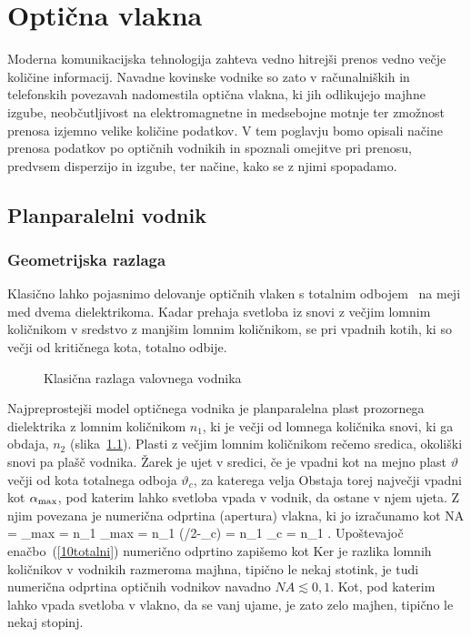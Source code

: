 
\chapter{Optična vlakna}
Moderna komunikacijska tehnologija zahteva vedno hitrejši prenos
vedno večje količine informacij. Navadne kovinske vodnike
so zato v računalniških in telefonskih povezavah nadomestila optična 
vlakna, ki jih odlikujejo majhne izgube, neobčutljivost na elektromagnetne
in medsebojne motnje ter zmožnost prenosa izjemno velike količine podatkov. 
V tem poglavju bomo opisali načine prenosa podatkov po optičnih vodnikih
in spoznali omejitve pri prenosu,
predvsem disperzijo in izgube, ter načine, kako se z njimi spopadamo.

\section{Planparalelni vodnik}
\subsection*{Geometrijska razlaga}
Klasično lahko pojasnimo delovanje optičnih vlaken s totalnim odbojem~
na meji med dvema dielektrikoma. Kadar prehaja svetloba iz snovi 
z večjim lomnim količnikom v sredstvo z manjšim lomnim količnikom,
se pri vpadnih kotih, ki so večji od kritičnega kota, totalno odbije. 
\begin{figure}[h]
\centering
\def\svgwidth{110truemm} 

\caption{Klasična razlaga valovnega vodnika}
\label{fig:vodnik}
\end{figure}

Najpreprostejši model optičnega vodnika je planparalelna plast prozornega
dielektrika z lomnim količnikom $n_{1}$, ki je večji od lomnega količnika
snovi, ki ga obdaja, $n_2$ (slika~\ref{fig:vodnik}). 
Plasti z večjim lomnim količnikom rečemo sredica, okoliški snovi 
pa plašč vodnika. Žarek je ujet v sredici, če je vpadni kot 
na mejno plast $\vartheta$ večji od kota totalnega odboja $\vartheta_c$, 
za katerega velja 
Obstaja torej največji vpadni kot $\alpha_{\rm max}$, pod katerim 
lahko svetloba vpada v vodnik, da ostane v njem ujeta.
Z njim povezana je numerična odprtina (apertura) vlakna, 
ki jo izračunamo kot 
\beq
NA = \sin \alpha_{\rm max} = n_1 \sin \beta_{\rm max} = 
n_1 \sin(\pi/2-\vartheta_c) =
n_1 \cos\vartheta_c = n_1 .
\label{10NAa}
\eeq
Upoštevajoč enačbo~(\ref{10totalni}) numerično odprtino zapišemo kot 
Ker je razlika lomnih količnikov v vodnikih razmeroma majhna,
tipično le nekaj stotink, je tudi numerična odprtina optičnih 
vodnikov navadno
$NA \lesssim 0,1 $. Kot, pod katerim lahko vpada svetloba
v vlakno, da se vanj ujame, je zato zelo majhen, tipično le nekaj stopinj.

